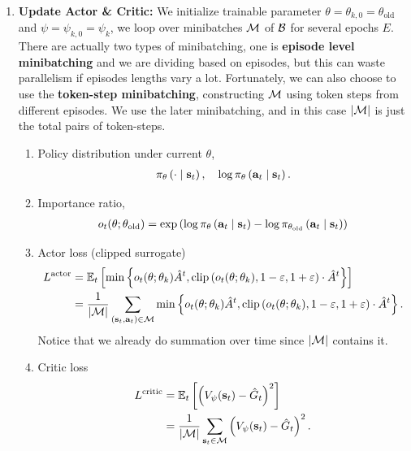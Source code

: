 \documentclass[11pt]{article}  %
\begin{document}
\begin{enumerate}
  \item \textbf{Update Actor \& Critic:} We initialize trainable parameter $\theta = \theta_{k, 0} = \theta_{\text{old}}$ and $\psi = \psi_{k, 0} = \psi_k$, we loop over minibatches $\mathcal{M}$ of $\mathcal{B}$ for several epochs $E$. 
  There are actually two types of minibatching, one is \textbf{episode level minibatching} and we are dividing based on episodes, but this can waste parallelism if episodes lengths vary a lot.
  Fortunately, we can also choose to use the \textbf{token-step minibatching}, constructing $\mathcal{M}$ using token steps from different episodes.
  We use the later minibatching, and in this case $\lvert\mathcal{M}\rvert$ is just the total pairs of token-steps.
  \begin{enumerate}
    \item[(I)] Policy distribution under current $\theta$, 
    \begin{align*}
      \pi_{\theta}\left( \cdot \mid \mathbf{s}_t \right), \quad \log\pi_{\theta}\left( \mathbf{a}_t \mid \mathbf{s}_t \right).
    \end{align*} 
    
    \item[(II)] Importance ratio,
    \begin{align*}
      o_t(\theta; \theta_{\text{old}}) = \exp\left( \log \pi_{\theta}\left( \mathbf{a}_t \mid \mathbf{s}_t \right) - \log \pi_{\theta_{\text{old}}}\left( \mathbf{a}_t \mid \mathbf{s}_t \right) \right)
    \end{align*} 

    \item[(III)] Actor loss (clipped surrogate)
    \begin{align*}
      L^{\text{actor}} &= \mathbb{E}_{t}\left[\min\left\{ o_t(\theta; \theta_k) \hat{A}^t, \text{clip}\left( o_t(\theta; \theta_k), 1-\varepsilon, 1+\varepsilon \right)\cdot\hat{A}^t \right\}\right] \\
      &= \frac{1}{\lvert\mathcal{M}\rvert} \sum_{\left( \mathbf{s}_t, \mathbf{a}_t \right) \in \mathcal{M}} \min\left\{ o_t(\theta; \theta_k) \hat{A}^t, \text{clip}\left( o_t(\theta; \theta_k), 1-\varepsilon, 1+\varepsilon \right)\cdot\hat{A}^t \right\}.
    \end{align*}
    Notice that we already do summation over time since $\lvert\mathcal{M}\rvert$ contains it. 

    \item[(IV)] Critic loss 
    \begin{align*}
      L^{\text{critic}} &= \mathbb{E}_{t}\left[\left( V_{\psi}(\mathbf{s}_t) - \hat{G}_t \right)^2\right] \\
      &= \frac{1}{\lvert\mathcal{M}\rvert} \sum_{\mathbf{s}_t \in \mathcal{M}}\left( V_{\psi}(\mathbf{s}_t) - \hat{G}_t \right)^2.
    \end{align*}


\end{enumerate}
\end{enumerate}
\end{document}
